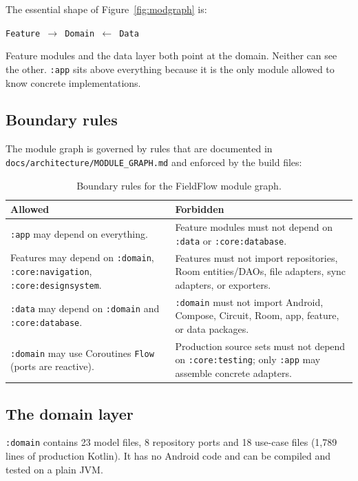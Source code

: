 \documentclass[11pt,a4paper]{article}
\newcommand{\mdl}[1]{\texttt{#1}}
\newcommand{\file}[1]{{\small\texttt{#1}}}
\begin{document}
The essential shape of Figure~\ref{fig:modgraph} is:

\begin{center}
\texttt{Feature $\longrightarrow$ Domain $\longleftarrow$ Data}
\end{center}

Feature modules and the data layer both point at the domain. Neither can see the
other. \mdl{:app} sits above everything because it is the only module allowed to
know concrete implementations.

\subsection{Boundary rules}

The module graph is governed by rules that are documented in
\file{docs/architecture/MODULE\_GRAPH.md} and enforced by the build files:

\begin{table}[H]
\centering
\small
\begin{tabularx}{\linewidth}{@{}p{6.2cm} X@{}}
\toprule
\textbf{Allowed} & \textbf{Forbidden} \\
\midrule
\mdl{:app} may depend on everything.
& Feature modules must not depend on \mdl{:data} or \mdl{:core:database}. \\
\addlinespace
Features may depend on \mdl{:domain}, \mdl{:core:navigation}, \mdl{:core:designsystem}.
& Features must not import repositories, Room entities/DAOs, file adapters, sync adapters, or exporters. \\
\addlinespace
\mdl{:data} may depend on \mdl{:domain} and \mdl{:core:database}.
& \mdl{:domain} must not import Android, Compose, Circuit, Room, app, feature, or data packages. \\
\addlinespace
\mdl{:domain} may use Coroutines \texttt{Flow} (ports are reactive).
& Production source sets must not depend on \mdl{:core:testing}; only \mdl{:app} may assemble concrete adapters. \\
\bottomrule
\end{tabularx}
\caption{Boundary rules for the FieldFlow module graph.}
\end{table}

\subsection{The domain layer}

\mdl{:domain} contains 23 model files, 8 repository ports and 18 use-case files
(1{,}789 lines of production Kotlin). It has no Android code and can be compiled
and tested on a plain JVM.
\end{document}
